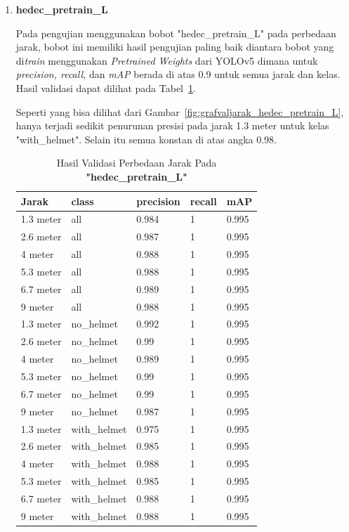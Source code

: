 \begin{enumerate}
   
  \item \textbf{hedec\_pretrain\_L}
  
  \par Pada pengujian menggunakan bobot "hedec\_pretrain\_L" pada perbedaan jarak, bobot ini memiliki hasil pengujian
  paling baik diantara bobot yang di\emph{train} menggunakan \emph{Pretrained Weights} dari YOLOv5 dimana untuk \emph{precision, recall,} dan \emph{mAP} berada di atas 0.9 untuk semua jarak
  dan kelas. Hasil validasi dapat dilihat pada Tabel~\ref{tb:hasiljarak_hedec_pretrain_L}.

  \par Seperti yang bisa dilihat dari Gambar~\ref{fig:grafvaljarak_hedec_pretrain_L}, hanya terjadi sedikit penurunan presisi
  pada jarak 1.3 meter untuk kelas "with\_helmet". Selain itu semua konstan di atas angka 0.98.


  \begin{longtable}{|l|l|l|l|l|} 
    \caption{Hasil Validasi Perbedaan Jarak Pada \textbf{"hedec\_pretrain\_L"}}
    \label{tb:hasiljarak_hedec_pretrain_L}\\
    \hline
    Jarak     & class        & precision & recall & mAP    \\ 
    \hline
    1.3 meter & all          & 0.984     & 1      & 0.995  \\
    2.6 meter & all          & 0.987     & 1      & 0.995  \\
    4 meter   & all          & 0.988     & 1      & 0.995  \\
    5.3 meter & all          & 0.988     & 1      & 0.995  \\
    6.7 meter & all          & 0.989     & 1      & 0.995  \\
    9 meter   & all          & 0.988     & 1      & 0.995  \\
    1.3 meter & no\_helmet   & 0.992     & 1      & 0.995  \\
    2.6 meter & no\_helmet   & 0.99      & 1      & 0.995  \\
    4 meter   & no\_helmet   & 0.989     & 1      & 0.995  \\
    5.3 meter & no\_helmet   & 0.99      & 1      & 0.995  \\
    6.7 meter & no\_helmet   & 0.99      & 1      & 0.995  \\
    9 meter   & no\_helmet   & 0.987     & 1      & 0.995  \\
    1.3 meter & with\_helmet & 0.975     & 1      & 0.995  \\
    2.6 meter & with\_helmet & 0.985     & 1      & 0.995  \\
    4 meter   & with\_helmet & 0.988     & 1      & 0.995  \\
    5.3 meter & with\_helmet & 0.985     & 1      & 0.995  \\
    6.7 meter & with\_helmet & 0.988     & 1      & 0.995  \\
    9 meter   & with\_helmet & 0.988     & 1      & 0.995  \\
    \hline
  \end{longtable}


\end{enumerate}
